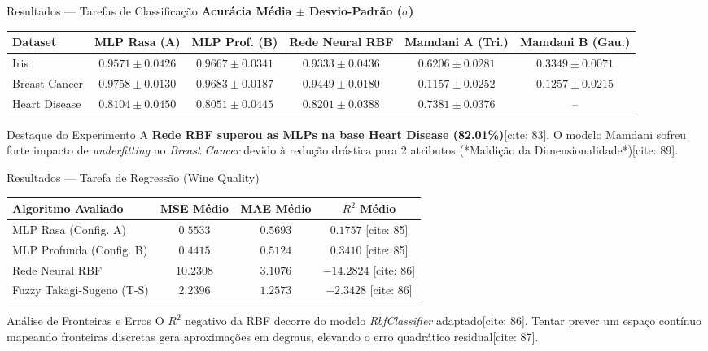 \documentclass[10pt, aspectratio=169]{beamer}
\begin{document}
\begin{frame}{Resultados — Tarefas de Classificação}
    \centering
    \textbf{Acurácia Média $\pm$ Desvio-Padrão ($\sigma$)} \\
    \vspace{0.15cm}
    \scriptsize
    \begin{tabular}{lccccc}
        \toprule
        \textbf{Dataset} & \textbf{MLP Rasa (A)} & \textbf{MLP Prof. (B)} & \textbf{Rede Neural RBF} & \textbf{Mamdani A (Tri.)} & \textbf{Mamdani B (Gau.)} \\
        \midrule
        Iris & $0.9571 \pm 0.0426$ & $\mathbf{0.9667 \pm 0.0341}$ & $0.9333 \pm 0.0436$ & $0.6206 \pm 0.0281$ & $0.3349 \pm 0.0071$ \\
        Breast Cancer & $\mathbf{0.9758 \pm 0.0130}$ & $0.9683 \pm 0.0187$ & $0.9449 \pm 0.0180$ & $0.1157 \pm 0.0252$ & $0.1257 \pm 0.0215$ \\
        Heart Disease & $0.8104 \pm 0.0450$ & $0.8051 \pm 0.0445$ & $\mathbf{0.8201 \pm 0.0388}$ & $0.7381 \pm 0.0376$ & -- \\
        \bottomrule
    \end{tabular}
    \vspace{0.15cm}
    \begin{block}{Destaque do Experimento}
        A \textbf{Rede RBF superou as MLPs na base Heart Disease (82.01\%)}[cite: 83]. O modelo Mamdani sofreu forte impacto de \textit{underfitting} no \textit{Breast Cancer} devido à redução drástica para 2 atributos (*Maldição da Dimensionalidade*)[cite: 89].
    \end{block}
\end{frame}

\begin{frame}{Resultados — Tarefa de Regressão (Wine Quality)}
    \centering
    \small
    \begin{tabular}{lccc}
        \toprule
        \textbf{Algoritmo Avaliado} & \textbf{MSE Médio} & \textbf{MAE Médio} & \textbf{$R^2$ Médio} \\
        \midrule
        MLP Rasa (Config. A) & $0.5533$ & $0.5693$ & $0.1757$ [cite: 85] \\
        MLP Profunda (Config. B) & $\mathbf{0.4415}$ & $\mathbf{0.5124}$ & $\mathbf{0.3410}$ [cite: 85] \\
        Rede Neural RBF & $10.2308$ & $3.1076$ & $-14.2824$ [cite: 86] \\
        Fuzzy Takagi-Sugeno (T-S) & $2.2396$ & $1.2573$ & $-2.3428$ [cite: 86] \\
        \bottomrule
    \end{tabular}
    \vspace{0.2cm}
    \begin{alertblock}{Análise de Fronteiras e Erros}
        O $R^2$ negativo da RBF decorre do modelo \textit{RbfClassifier} adaptado[cite: 86]. Tentar prever um espaço contínuo mapeando fronteiras discretas gera aproximações em degraus, elevando o erro quadrático residual[cite: 87].
    \end{alertblock}
\end{frame}
\end{document}
